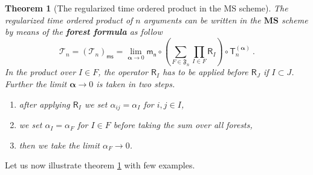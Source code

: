 \documentclass[11pt]{book}
\newcommand{\ms}{\mathsf{ms}}
\newcommand{\MS}{\textbf{MS}}
\newcommand{\alphabd}{\boldsymbol{\alpha}}
\newcommand{\Tcal}{\mathcal{T}}
\newcommand{\Frak}{\mathfrak{F}}
\newcommand{\Rsf}{\mathsf{R}}
\newcommand{\Tsf}{\mathsf{T}}
\newcommand{\msf}{\mathsf{m}}
\newcommand{\nsf}{\mathsf{n}}
\theoremstyle{break}
\newtheorem{theorem}{Theorem}[chapter]
\begin{document}
\begin{theorem}[The regularized time ordered product in the MS scheme] \label{theo:renorm_t_prod_ms_forest}
The regularized time ordered product of $n$ arguments can be written in the $\MS$ scheme by means of the \textbf{forest formula} as follow
%
\begin{equation}
\Tcal_n = \left(\Tcal_n\right)_\ms = \lim_{\alphabd \to 0} \msf_\nsf \circ \left( \sum_{F\in\Frak_{\overline{n}}} \prod_{I\in F} \Rsf_I \right) \circ \Tsf^{(\alphabd)}_n \ .
\label{eq:ms_t_forest}
\end{equation}
%
In the product over $I\in F$, the operator $\Rsf_I$ has to be applied before $\Rsf_J$ if $I\subset J$. Further the limit $\alphabd \to 0$ is taken in two steps. 
%
\begin{enumerate}
\item after applying $\Rsf_I$ we set $\alpha_{ij}=\alpha_I$ for $i,j\in I$,
%
\item we set $\alpha_{I} = \alpha_F$ for $I \in F$ before taking the sum over all forests,
%
\item then we take the limit $\alpha_F \to 0$.
\end{enumerate}
%
%
\end{theorem}


Let us now illustrate theorem \ref{theo:renorm_t_prod_ms_forest} with few examples.
\end{document}
